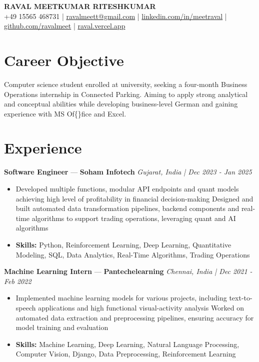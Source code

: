 \documentclass[a4paper,10pt]{article}
\begin{document}
\begin{center}
  {\Large\bfseries RAVAL MEETKUMAR RITESHKUMAR}\\[2pt]
  {\small +49 15565 468731 \;|\; \href{mailto:ravalmeett@gmail.com}{ravalmeett@gmail.com} \;|\; \href{https://www.linkedin.com/in/meetraval/}{linkedin.com/in/meetraval} \;|\; \href{https://github.com/ravalmeet}{github.com/ravalmeet} \;|\; \href{https://raval.vercel.app/}{raval.vercel.app}}
\end{center}
\vspace{-3pt}

\section*{Career Objective}
Computer science student enrolled at university, seeking a four-month Business Operations internship in Connected Parking. Aiming to apply strong analytical and conceptual abilities while developing business-level German and gaining experience with MS Of\{\}fice and Excel.\par

\section*{Experience}
\textbf{Software Engineer} — \textbf{Soham Infotech} \hfill \textit{Gujarat, India \;|\; Dec 2023 - Jan 2025}\par
\vspace{1pt}
\begin{itemize}
  \item Developed multiple functions, modular API endpoints and quant models achieving high level of profitability in financial decision-making Designed and built automated data transformation pipelines, backend components and real-time algorithms to support trading operations, leveraging quant and AI algorithms
  \item \textbf{Skills:} Python, Reinforcement Learning, Deep Learning, Quantitative Modeling, SQL, Data Analytics, Real-Time Algorithms, Trading Operations
\end{itemize}
\vspace{3pt}
\textbf{Machine Learning Intern} — \textbf{Pantechelearning} \hfill \textit{Chennai, India \;|\; Dec 2021 - Feb 2022}\par
\vspace{1pt}
\begin{itemize}
  \item Implemented machine learning models for various projects, including text-to-speech applications and high functional visual-activity analysis Worked on automated data extraction and preprocessing pipelines, ensuring accuracy for model training and evaluation
  \item \textbf{Skills:} Machine Learning, Deep Learning, Natural Language Processing, Computer Vision, Django, Data Preprocessing, Reinforcement Learning
\end{itemize}
\end{document}
